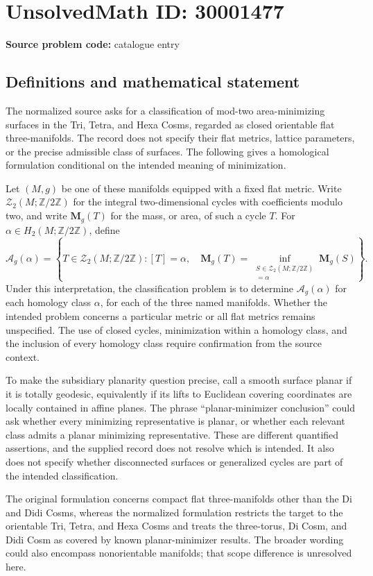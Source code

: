 \documentclass[11pt]{article}
\newcommand{\Z}{\mathbb{Z}}
\begin{document}
\section*{UnsolvedMath ID: 30001477}
\textbf{Source problem code:} catalogue entry
\subsection{Definitions and mathematical statement}
The normalized source asks for a classification of mod-two area-minimizing surfaces in the Tri, Tetra, and Hexa Cosms, regarded as closed orientable flat three-manifolds. The record does not specify their flat metrics, lattice parameters, or the precise admissible class of surfaces. The following gives a homological formulation conditional on the intended meaning of minimization.

Let \((M,g)\) be one of these manifolds equipped with a fixed flat metric. Write \(\mathcal Z_2(M;\Z/2\Z)\) for the integral two-dimensional cycles with coefficients modulo two, and write \(\mathbf M_g(T)\) for the mass, or area, of such a cycle \(T\). For \(\alpha\in H_2(M;\Z/2\Z)\), define
\[
\mathcal A_g(\alpha)=\left\{T\in\mathcal Z_2(M;\Z/2\Z):[T]=\alpha,\quad \mathbf M_g(T)=\inf_{\substack{S\in\mathcal Z_2(M;\Z/2\Z)\\[S]=\alpha}}\mathbf M_g(S)\right\}.
\]
Under this interpretation, the classification problem is to determine \(\mathcal A_g(\alpha)\) for each homology class \(\alpha\), for each of the three named manifolds. Whether the intended problem concerns a particular metric or all flat metrics remains unspecified. The use of closed cycles, minimization within a homology class, and the inclusion of every homology class require confirmation from the source context.

To make the subsidiary planarity question precise, call a smooth surface planar if it is totally geodesic, equivalently if its lifts to Euclidean covering coordinates are locally contained in affine planes. The phrase ``planar-minimizer conclusion'' could ask whether every minimizing representative is planar, or whether each relevant class admits a planar minimizing representative. These are different quantified assertions, and the supplied record does not resolve which is intended. It also does not specify whether disconnected surfaces or generalized cycles are part of the intended classification.

The original formulation concerns compact flat three-manifolds other than the Di and Didi Cosms, whereas the normalized formulation restricts the target to the orientable Tri, Tetra, and Hexa Cosms and treats the three-torus, Di Cosm, and Didi Cosm as covered by known planar-minimizer results. The broader wording could also encompass nonorientable manifolds; that scope difference is unresolved here.
\end{document}
